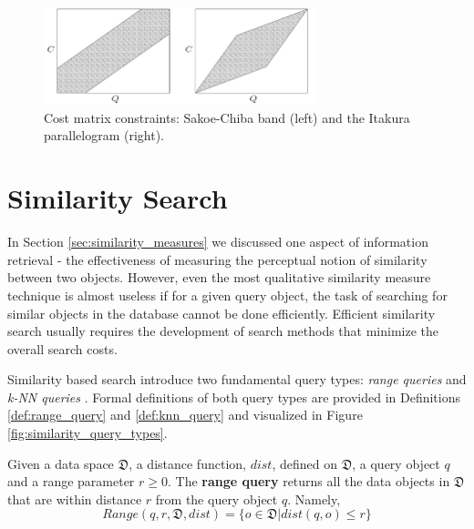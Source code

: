 \begin{figure}
\centering
\includegraphics[width=0.7\textwidth]{./figures/dtw_sukoe_chuba}       
\caption{Cost matrix constraints: Sakoe-Chiba band (left) and the Itakura parallelogram (right).}
\label{fig:dtw_sukoe_chuba}
\end{figure}

\newpage{}

\section{Similarity Search}
\label{sec:similarity_search}
 
\iftoggle{edit-mode}{\hspace{0pt}\marginpar{Introduction}}{}
In Section \ref{sec:similarity_measures} we discussed one aspect of information retrieval - the effectiveness of measuring the perceptual notion of similarity between two objects.
However, even the most qualitative similarity measure technique is almost useless if for a given query object, the task of searching for similar objects in the database cannot be done efficiently.
Efficient similarity search usually requires the development of search methods that minimize the overall search costs.

\iftoggle{edit-mode}{\hspace{0pt}\marginpar{Similarity search query types}}{}
Similarity based search introduce two fundamental query types: \emph{range queries} and \emph{k-NN queries} \cite{hetland2009basic}. 
Formal definitions of both query types are provided in Definitions \ref{def:range_query} and \ref{def:knn_query} and visualized in Figure \ref{fig:similarity_query_types}.

\begin{definition}
Given a data space $\mathfrak{D}$, a distance function, $dist$, defined on $\mathfrak{D}$, a query object $q$ and a range parameter $r \geq 0$. The \textbf{range query} returns all the data objects in $\mathfrak{D}$ that are within distance $r$ from the query object $q$. Namely,
\begin{equation}
Range(q,r,\mathfrak{D},dist)=\{o \in \mathfrak{D} | dist(q,o) \leq r \}
\end{equation}
\label{def:range_query} 
\end{definition}

